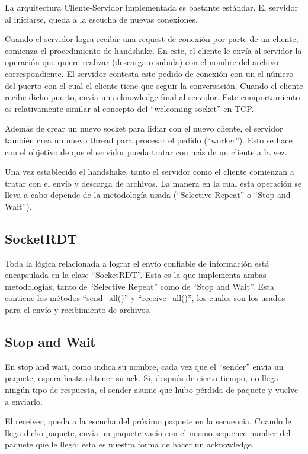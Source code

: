 \documentclass{article}
\begin{document}
La arquitectura Cliente-Servidor implementada es bastante estándar. El servidor al iniciarse, queda a la escucha de nuevas conexiones.

Cuando el servidor logra recibir una request de conexión por parte de un cliente; comienza el procedimiento de handshake. En este, el cliente le envía al servidor la operación que quiere realizar (descarga o subida) con el nombre del archivo correspondiente. El servidor contesta este pedido de conexión con un el número del puerto con el cual el cliente tiene que seguir la conversación. Cuando el cliente recibe dicho puerto, envía un acknowledge final al servidor. Este comportamiento es relativamente similar al concepto del ``welcoming socket'' en TCP.

Además de crear un nuevo socket para lidiar con el nuevo cliente, el servidor también crea un nuevo thread para procesar el pedido (``worker''). Esto se hace con el objetivo de que el servidor pueda tratar con más de un cliente a la vez.

Una vez establecido el handshake, tanto el servidor como el cliente comienzan a tratar con el envío y descarga de archivos. La manera en la cual esta operación se lleva a cabo depende de la metodología usada (``Selective Repeat'' o ``Stop and Wait'').

\subsection{SocketRDT}\label{socketrdt}

Toda la lógica relacionada a lograr el envío confiable de información está encapsulada en la clase ``SocketRDT''. Esta es la que implementa ambas metodologías, tanto de ``Selective Repeat'' como de ``Stop and Wait''. Esta contiene los métodos ``send\_all()'' y ``receive\_all()'', los cuales son los usados para el envío y recibimiento de archivos.

\subsection{Stop and Wait}\label{stop-and-wait}

En stop and wait, como indica su nombre, cada vez que el ``sender'' envía un paquete, espera hasta obtener su ack. Si, después de cierto tiempo, no llega ningún tipo de respuesta, el sender asume que hubo pérdida de paquete y vuelve a enviarlo.

El receiver, queda a la escucha del próximo paquete en la secuencia. Cuando le llega dicho paquete, envía un paquete vacío con el mismo sequence number del paquete que le llegó; esta es nuestra forma de hacer un acknowledge.
\end{document}
